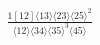 \documentclass[varwidth, border=5pt]{standalone}
\begin{document}
\begin{my}
$\begin{gathered}
\scriptscriptstyle\frac{1[12]⟨13⟩⟨23⟩⟨25⟩^2}{⟨12⟩⟨34⟩⟨35⟩^3⟨45⟩}
\end{gathered}$
\end{my}
\end{document}

